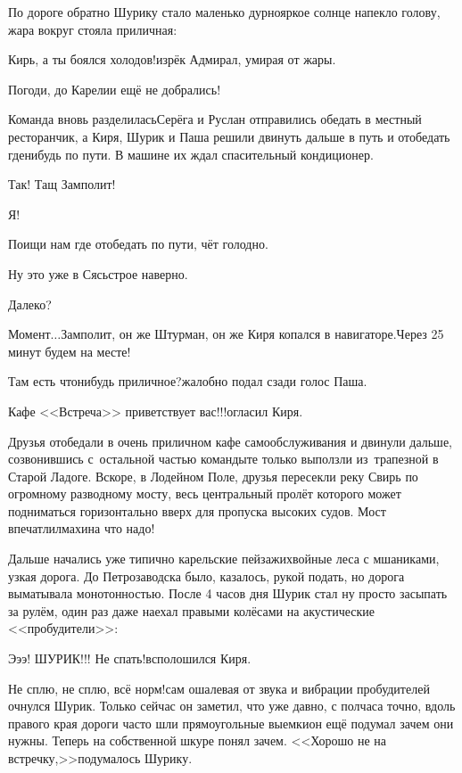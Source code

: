 По дороге обратно Шурику стало маленько дурно\mdash яркое солнце напекло голову, жара вокруг стояла приличная:

\diagdash Кирь, а ты боялся холодов!\mdash изрёк Адмирал, умирая от жары.

\diagdash Погоди, до Карелии ещё не добрались!

Команда вновь разделилась\mdash Серёга и Руслан отправились обедать в местный ресторанчик, а Киря, Шурик и Паша решили двинуть дальше в путь и отобедать где\sdash нибудь по пути. В машине их ждал спасительный кондиционер.

\diagdash Так! Тащ Замполит!

\diagdash Я!

\diagdash Поищи нам где отобедать по пути, чёт голодно.

\diagdash Ну это уже в Сясьстрое наверно.

\diagdash Далеко?

\diagdash Момент$\ldots$\mdash Замполит, он же Штурман, он же Киря копался в навигаторе.\mdash Через 25 минут будем на месте!

\diagdash Там есть что\sdash нибудь приличное?\mdash жалобно подал сзади голос Паша.

\diagdash Кафе <<Встреча>> приветствует вас!!!\mdash огласил Киря.

Друзья отобедали в очень приличном кафе самообслуживания и двинули дальше, созвонившись с~остальной частью команды\mdash те только выползли из~трапезной в Старой Ладоге. Вскоре, в Лодейном Поле, друзья пересекли реку Свирь по огромному разводному мосту, весь центральный пролёт которого может подниматься горизонтально вверх для пропуска высоких судов. Мост впечатлил\mdash махина что надо!

Дальше начались уже типично карельские пейзажи\mdash хвойные леса с мшаниками, узкая дорога. До Петрозаводска было, казалось, рукой подать, но дорога выматывала монотонностью. После 4 часов дня Шурик стал ну просто засыпать за рулём, один раз даже наехал правыми колёсами на акустические <<пробудители>>:

\diagdash Э\sdash э\sdash э! ШУРИК!!! Не спать!\mdash всполошился Киря.

\diagdash Не сплю, не сплю, всё норм!\mdash сам ошалевая от звука и вибрации пробудителей очнулся Шурик. Только сейчас он заметил, что уже давно, с полчаса точно, вдоль правого края дороги часто шли прямоугольные выемки\mdash он ещё подумал зачем они нужны. Теперь на собственной шкуре понял зачем. <<Хорошо не на встречку,>>\mdash подумалось Шурику.

